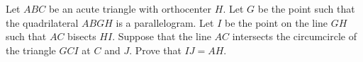Let 
$ABC$
 be an acute triangle with orthocenter 
$H$.
 Let 
$G$
 be the point such that the quadrilateral 
$ABGH$
 is a parallelogram. Let 
$I$
 be the point on the line 
$GH$
 such that 
$AC$
 bisects 
$HI$.
 Suppose that the line 
$AC$
 intersects the circumcircle of the triangle 
$GCI$
 at 
$C$
 and 
$J$.
 Prove that 
$IJ = AH$.
